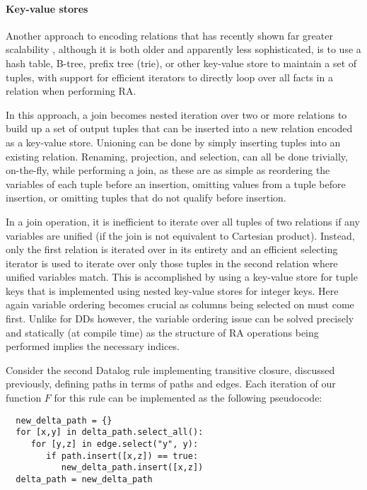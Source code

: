 \paragraph{Key-value stores} Another approach to encoding relations that has recently shown far greater scalability \cite{}, although it is both older and apparently less sophisticated, is to use a hash table, B-tree, prefix tree (trie), or other key-value store to maintain a set of tuples, with support for efficient iterators to directly loop over all facts in a relation when performing RA.

In this approach, a join becomes nested iteration over two or more relations to build up a set of output tuples that can be inserted into a new relation encoded as a key-value store. Unioning can be done by simply inserting tuples into an existing relation. Renaming, projection, and selection, can all be done trivially, on-the-fly, while performing a join, as these are as simple as reordering the variables of each tuple before an insertion, omitting values from a tuple before insertion, or omitting tuples that do not qualify before insertion.

In a join operation, it is inefficient to iterate over all tuples of two relations if any variables are unified (if the join is not equivalent to Cartesian product). Instead, only the first relation is iterated over in its entirety and an efficient selecting iterator is used to iterate over only those tuples in the second relation where unified variables match. This is accomplished by using a key-value store for tuple keys that is implemented using nested key-value stores for integer keys. Here again variable ordering becomes crucial as columns being selected on must come first. Unlike for DDs however, the variable ordering issue can be solved precisely and statically (at compile time) as the structure of RA operations being performed implies the necessary indices.

Consider the second Datalog rule implementing transitive closure, discussed previously, defining paths in terms of paths and edges. Each iteration of our function $F$ for this rule can be implemented as the following pseudocode:

\begin{verbatim}
  new_delta_path = {}
  for [x,y] in delta_path.select_all():
     for [y,z] in edge.select("y", y):
        if path.insert([x,z]) == true:
           new_delta_path.insert([x,z])
  delta_path = new_delta_path   
\end{verbatim}



